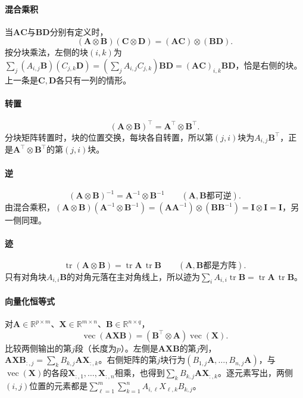 \paragraph{混合乘积}
当$\bm A\bm C$与$\bm B\bm D$分别有定义时，
\begin{equation}
 (\bm A\otimes\bm B)(\bm C\otimes\bm D)
 =(\bm A\bm C)\otimes(\bm B\bm D).
 \label{eq:matrix-analysis-kronecker-mixed-product}
\end{equation}
按分块乘法，左侧的块$(i,k)$为$\sum_j(A_{i,j}\bm B)(C_{j,k}\bm D)=(\sum_jA_{i,j}C_{j,k})\bm B\bm D=(\bm A\bm C)_{i,k}\bm B\bm D$，恰是右侧的块。上一条是$\bm C,\bm D$各只有一列的情形。

\paragraph{转置}
\[
 (\bm A\otimes\bm B)^\top=\bm A^\top\otimes\bm B^\top.
\]
分块矩阵转置时，块的位置交换，每块各自转置，所以第$(j,i)$块为$A_{i,j}\bm B^\top$，正是$\bm A^\top\otimes\bm B^\top$的第$(j,i)$块。

\paragraph{逆}
\[
 (\bm A\otimes\bm B)^{-1}=\bm A^{-1}\otimes\bm B^{-1}\qquad(\bm A,\bm B\text{都可逆}).
\]
由混合乘积，$(\bm A\otimes\bm B)(\bm A^{-1}\otimes\bm B^{-1})=(\bm A\bm A^{-1})\otimes(\bm B\bm B^{-1})=\bm I\otimes\bm I=\bm I$，另一侧同理。

\paragraph{迹}
\[
 \operatorname{tr}(\bm A\otimes\bm B)=\operatorname{tr}\bm A\,\operatorname{tr}\bm B\qquad(\bm A,\bm B\text{都是方阵}).
\]
只有对角块$A_{i,i}\bm B$的对角元落在主对角线上，所以迹为$\sum_iA_{i,i}\operatorname{tr}\bm B=\operatorname{tr}\bm A\,\operatorname{tr}\bm B$。

\paragraph{向量化恒等式}
对$\bm A\in\mathbb R^{p\times m}$、$\bm X\in\mathbb R^{m\times n}$、$\bm B\in\mathbb R^{n\times q}$，
\begin{equation}
 \operatorname{vec}(\bm A\bm X\bm B)
 =(\bm B^\top\otimes\bm A)\operatorname{vec}(\bm X).
 \label{eq:matrix-analysis-vec-kronecker}
\end{equation}
比较两侧输出的第$j$段（长度为$p$）。左侧是$\bm A\bm X\bm B$的第$j$列，$\bm A\bm X\bm B_{:,j}=\sum_kB_{k,j}\bm A\bm X_{:,k}$。右侧矩阵的第$j$块行为$(B_{1,j}\bm A,\ldots,B_{n,j}\bm A)$，与$\operatorname{vec}(\bm X)$的各段$\bm X_{:,1},\ldots,\bm X_{:,n}$相乘，也得到$\sum_kB_{k,j}\bm A\bm X_{:,k}$。逐元素写出，两侧$(i,j)$位置的元素都是$\sum_{\ell=1}^m\sum_{k=1}^n A_{i,\ell}X_{\ell,k}B_{k,j}$。

